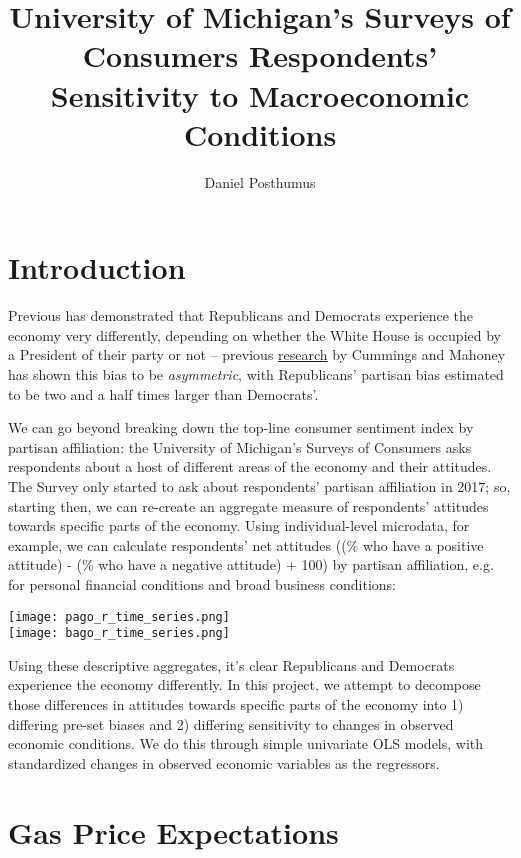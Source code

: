 \documentclass{article}
\title{University of Michigan's Surveys of Consumers Respondents' Sensitivity to Macroeconomic Conditions}
\author{Daniel Posthumus}
\begin{document}
\maketitle

\section{Introduction}

Previous has demonstrated that Republicans and Democrats experience the economy very differently, depending on whether the White House is occupied by a President of their party or not -- previous \href{https://www.briefingbook.info/p/asymmetric-amplification-and-the}{research} by Cummings and Mahoney has shown this bias to be \textit{asymmetric}, with Republicans' partisan bias estimated to be two and a half times larger than Democrats'.

We can go beyond breaking down the top-line consumer sentiment index by partisan affiliation: the University of Michigan's Surveys of Consumers asks respondents about a host of different areas of the economy and their attitudes. The Survey only started to ask about respondents' partisan affiliation in 2017; so, starting then, we can re-create an aggregate measure of respondents' attitudes towards specific parts of the economy. Using individual-level microdata, for example, we can calculate respondents' net attitudes ((\% who have a positive attitude) - (\% who have a negative attitude) + 100) by partisan affiliation, e.g. for personal financial conditions and broad business conditions:

\centering \texttt{[image: pago\_r\_time\_series.png]} \\
\texttt{[image: bago\_r\_time\_series.png]}

\raggedright Using these descriptive aggregates, it's clear Republicans and Democrats experience the economy differently. In this project, we attempt to decompose those differences in attitudes towards specific parts of the economy into 1) differing pre-set biases and 2) differing sensitivity to changes in observed economic conditions. We do this through simple univariate OLS models, with standardized changes in observed economic variables as the regressors. 

\section{Gas Price Expectations}
\end{document}
